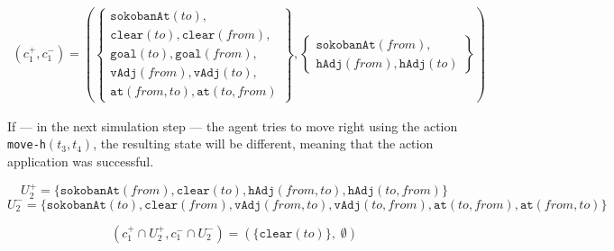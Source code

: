 \documentclass[../Master.tex]{subfiles}
\begin{document}
\begin{align}
(c_1^+, c_1^-) =
\left(
    \left\{
        \begin{gathered}
            \texttt{sokobanAt}(to), \\
            \texttt{clear}(to), \texttt{clear}(from), \\
            \texttt{goal}(to), \texttt{goal}(from), \\
            \texttt{vAdj}(from), \texttt{vAdj}(to), \\
            \texttt{at}(from, to), \texttt{at}(to, from)
        \end{gathered}
    \right\}
    ,
    \left\{
        \begin{gathered}
            \texttt{sokobanAt}(from), \\
            \texttt{hAdj}(from), \texttt{hAdj}(to)
        \end{gathered}
    \right\}
\right)
\end{align}

If --- in the next simulation step --- the agent tries to move right using the action \texttt{move-h}$(t_3, t_4)$, the resulting state will be different, meaning that the action application was successful.


\[
U_2^+ = \{ \texttt{sokobanAt}(from), \texttt{clear}(to), \texttt{hAdj}(from, to), \texttt{hAdj}(to, from) \}
\]
\[
U_2^- = \{ \texttt{sokobanAt}(to), \texttt{clear}(from), \texttt{vAdj}(from, to), \texttt{vAdj}(to, from), \texttt{at}(to, from), \texttt{at}(from, to) \}
\]

\[
(c_1^+ \cap U_2^+, c_1^- \cap U_2^-) = ( \{ \texttt{clear}(to) \}, \; \emptyset )
\]
\end{document}
